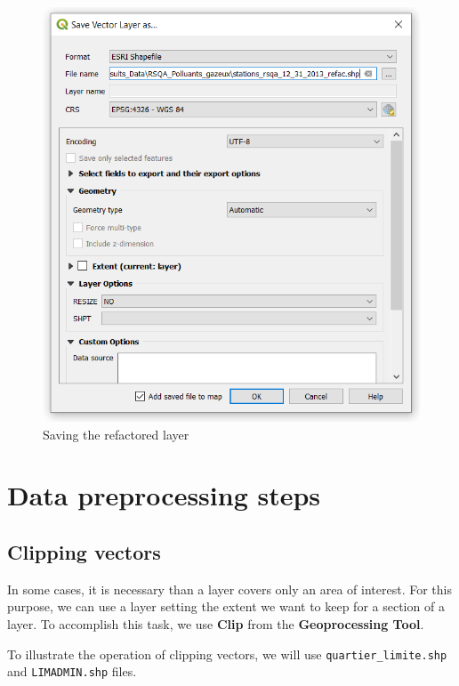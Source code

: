 \documentclass[]{book}
\theoremstyle{definition}
\theoremstyle{definition}
\theoremstyle{definition}
\theoremstyle{remark}
\begin{document}
\begin{figure}

{\centering \includegraphics[width=8.82in]{figures/Refactor_Dialog_Settings_2} 

}

\caption{Saving the refactored layer}\label{fig:unnamed-chunk-18}
\end{figure}

\chapter{Data preprocessing steps}\label{data-preprocessing-steps}

\section{Clipping vectors}\label{clipping-vectors}

In some cases, it is necessary than a layer covers only an area of
interest. For this purpose, we can use a layer setting the extent we
want to keep for a section of a layer. To accomplish this task, we use
\textbf{Clip} from the \textbf{Geoprocessing Tool}.

To illustrate the operation of clipping vectors, we will use
\texttt{quartier\_limite.shp} and \texttt{LIMADMIN.shp} files.
\end{document}
